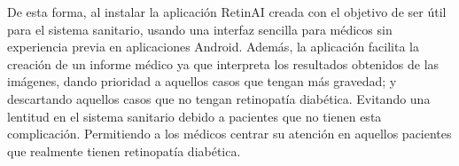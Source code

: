 De esta forma, al instalar la aplicación RetinAI creada con el objetivo de ser útil para el sistema sanitario, usando una interfaz sencilla para médicos sin experiencia previa en aplicaciones Android. Además, la aplicación facilita la creación de un informe médico ya que interpreta los resultados obtenidos de las imágenes, dando prioridad a aquellos casos que tengan más gravedad; y descartando aquellos casos que no tengan retinopatía diabética. Evitando una lentitud en el sistema sanitario debido a pacientes que no tienen esta complicación. 
Permitiendo a los médicos centrar su atención en aquellos pacientes que realmente tienen retinopatía diabética.